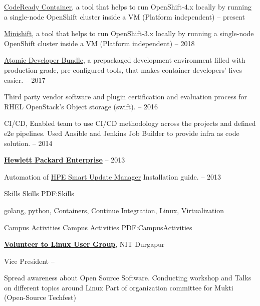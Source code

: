 \documentclass[letterpaper,MMMyyyy,nonstopmode]{simpleresumecv}
\begin{document}
\begin{Body}
\BulletItem
\href{https://github.com/code-ready/crc}
{{CodeReady Container}}, a tool that helps to run OpenShift-4.x locally by running a single-node \newline OpenShift cluster inside a VM (Platform independent)
\hfill
{} --
present

\BulletItem
\href{https://github.com/minishift/minishift}
{{Minishift}}, a tool that helps to run OpenShift-3.x locally by running a single-node \newline OpenShift cluster inside a VM (Platform independent)
\hfill
{} --
2018

\BulletItem
\href{https://github.com/projectatomic/adb-atomic-developer-bundle}
{{Atomic Developer Bundle}},  a prepackaged development environment filled with \newline production-grade, pre-configured tools, that makes container developers' lives easier.
\hfill
{} --
2017

\BulletItem
Third party vendor software and plugin certification and evaluation process for \newline RHEL OpenStack's Object storage (swift).
\hfill
{} --
2016

\BulletItem
CI/CD, Enabled team to use CI/CD methodology across the projects and defined \newline e2e pipelines. Used Ansible and Jenkins Job Builder to provide infra as code solution.
\hfill
{} --
2014

\Gap
\Gap
\Gap
\Entry
\href{https://www.hpe.com}
{\textbf{Hewlett Packard Enterprise}}
\hfill
{} --
2013

\BulletItem
Automation of \href{https://www.hpe.com/us/en/product-catalog/detail/pip.5182020.html}{HPE Smart Update Manager} Installation guide.
\hfill
{} --
2013


\Section
{Skills}
{Skills}
{PDF:Skills}

\Entry
golang,
python,
Containers,
Continue Integration,
Linux,
Virtualization


\Section
{Campus Activities}
{Campus Activities}
{PDF:CampusActivities}

\Entry
\href{http://nitdgplug.org/}
{\textbf{Volunteer to Linux User Group}},
NIT Durgapur

\Gap
\BulletItem
Vice President
\hfill
{} --
\begin{Detail}
\SubBulletItem
Spread awareness about Open Source Software.
\SubBulletItem
Conducting workshop and Talks on different topics around Linux
\SubBulletItem
Part of organization committee for Mukti (Open-Source Techfest)
\end{Detail}


\end{Body}
\end{document}
